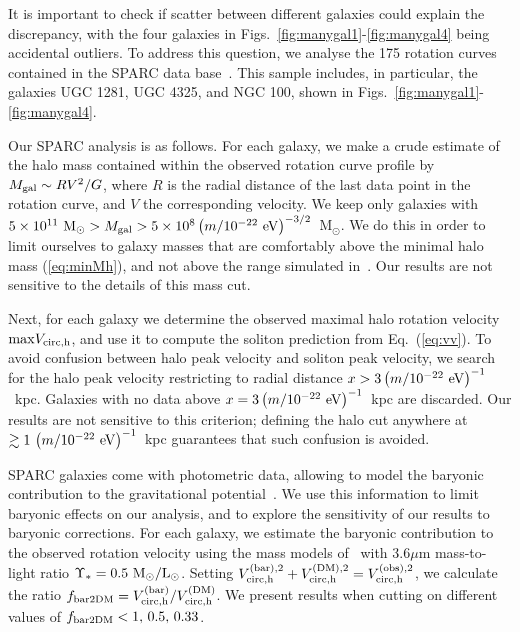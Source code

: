 \documentclass[aps,prd,floats,superscriptaddress,showpacs,nofootinbib,twocolumn,preprintnumbers]{revtex4-1}%
\begin{document}
It is important to check if scatter between different
galaxies could explain the discrepancy, with the four galaxies in
Figs.~\ref{fig:manygal1}-\ref{fig:manygal4} being accidental outliers.  
%
To address this question, we analyse the 175 rotation curves contained
in the SPARC data base~\cite{Lelli:2016zqa}.  
This sample includes, in particular, the galaxies UGC 1281, UGC 4325, and NGC 100, shown in
Figs.~\ref{fig:manygal1}-\ref{fig:manygal4}.  

Our SPARC analysis is as follows. For each galaxy, we make a crude
estimate of the halo mass contained within the observed rotation curve
profile by $M_{\rm gal}\sim RV^2/G$, where $R$ is the radial distance
of the last data point in the rotation curve, and
$V$ the corresponding velocity. We keep only galaxies with
$5\times10^{11}~{\rm M}_{\odot}>M_{\rm gal}>5\times10^8\left(m/10^{-22}~{\rm eV}\right)^{-3/2}$~M$_\odot$. We
do this in order to limit ourselves to galaxy masses 
that are comfortably above the minimal halo mass (\ref{eq:minMh}), and not above the range simulated in~\cite{Schive:2014hza,Schive:2014dra}.
Our results are not sensitive
to the details of this mass cut. 
 

Next, for each galaxy we determine the observed maximal halo rotation
velocity ${\rm max} V_{\rm circ,h}$, and use it to compute the soliton
prediction from Eq.~(\ref{eq:vv}). To avoid confusion between halo
peak velocity and soliton peak velocity, we search for the halo peak
velocity restricting to radial distance $x>3\left(m/10^{-22}~{\rm
    eV}\right)^{-1}$~kpc. Galaxies with no data above
$x=3\left(m/10^{-22}~{\rm eV}\right)^{-1}$~kpc are discarded. Our
results are not sensitive to this criterion; defining the halo cut anywhere at
$\gtrsim 1\,\left(m/10^{-22}~{\rm eV}\right)^{-1}$~kpc guarantees that
such confusion is avoided.  

SPARC galaxies come with photometric data, allowing to model the baryonic contribution to the gravitational potential~\cite{Lelli:2016zqa}. We use this information to limit baryonic effects on our analysis, and to explore the sensitivity of our results to baryonic corrections. For each galaxy, we estimate the baryonic contribution to the observed rotation velocity using the mass models of~\cite{Lelli:2016zqa} with 3.6$\mu$m mass-to-light ratio $\Upsilon_*=0.5~{\rm M_\odot/L_\odot}$. Setting $V_{\rm circ,h}^{(\rm bar),2}+V_{\rm circ,h}^{(\rm DM),2}=V_{\rm circ,h}^{(\rm obs),2}$, we calculate the ratio $f_{\rm bar2DM}=V_{\rm circ,h}^{(\rm bar)}/V_{\rm circ,h}^{(\rm DM)}$. We present results when cutting on different values of $f_{\rm bar2DM}<1,\,0.5,\,0.33$. 
\end{document}
